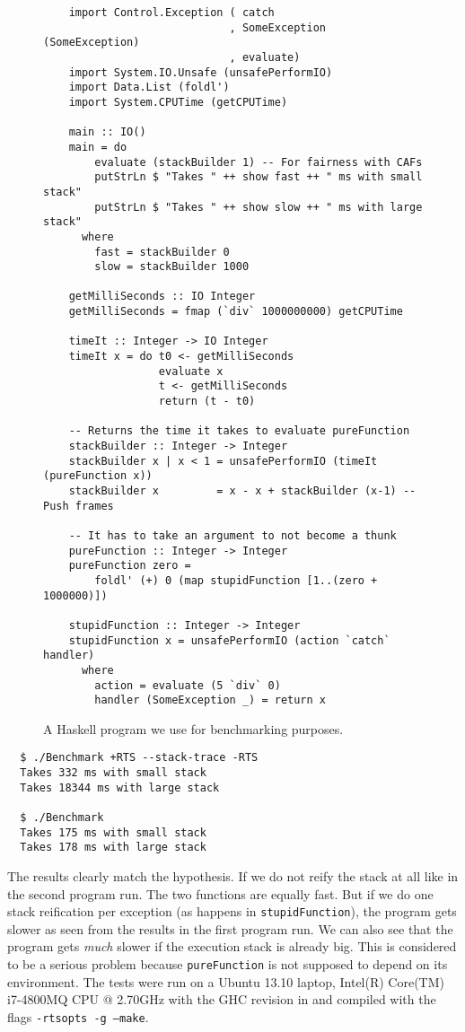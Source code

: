 \begin{figure}
\begin{mdframed}
  \begin{verbatim}
    import Control.Exception ( catch
                             , SomeException (SomeException)
                             , evaluate)
    import System.IO.Unsafe (unsafePerformIO)
    import Data.List (foldl')
    import System.CPUTime (getCPUTime)

    main :: IO()
    main = do
        evaluate (stackBuilder 1) -- For fairness with CAFs
        putStrLn $ "Takes " ++ show fast ++ " ms with small stack"
        putStrLn $ "Takes " ++ show slow ++ " ms with large stack"
      where
        fast = stackBuilder 0
        slow = stackBuilder 1000

    getMilliSeconds :: IO Integer
    getMilliSeconds = fmap (`div` 1000000000) getCPUTime

    timeIt :: Integer -> IO Integer
    timeIt x = do t0 <- getMilliSeconds
                  evaluate x
                  t <- getMilliSeconds
                  return (t - t0)

    -- Returns the time it takes to evaluate pureFunction
    stackBuilder :: Integer -> Integer
    stackBuilder x | x < 1 = unsafePerformIO (timeIt (pureFunction x))
    stackBuilder x         = x - x + stackBuilder (x-1) -- Push frames

    -- It has to take an argument to not become a thunk
    pureFunction :: Integer -> Integer
    pureFunction zero =
        foldl' (+) 0 (map stupidFunction [1..(zero + 1000000)])

    stupidFunction :: Integer -> Integer
    stupidFunction x = unsafePerformIO (action `catch` handler)
      where
        action = evaluate (5 `div` 0)
        handler (SomeException _) = return x
  \end{verbatim}
  \caption{A Haskell program we use for benchmarking purposes.}
  \label{fig:benchmark_program}
\end{mdframed}
\end{figure}

\begin{verbatim}
  $ ./Benchmark +RTS --stack-trace -RTS
  Takes 332 ms with small stack
  Takes 18344 ms with large stack

  $ ./Benchmark
  Takes 175 ms with small stack
  Takes 178 ms with large stack
\end{verbatim}

The results clearly match the hypothesis. If we do not reify the stack
at all like in the second program run. The two functions are equally
fast. But if we do one stack reification per exception (as happens in
\texttt{stupidFunction}), the program gets slower as seen from the
results in the first program run. We can also see that the program
gets \emph{much} slower if the execution stack is already big. This
is considered to be a serious problem because \texttt{pureFunction}
is not supposed to depend on its environment. 
The tests were run on a Ubuntu 13.10 laptop, Intel(R) Core(TM) i7-4800MQ CPU @
2.70GHz with the GHC revision in \cite{github_benchmarking_revision} and compiled with the flags
\texttt{-rtsopts -g --make}.

